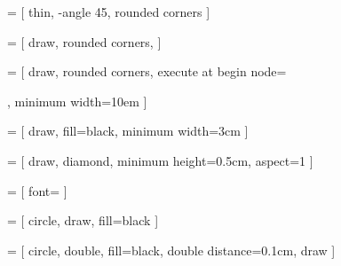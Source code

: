 

 = [%
    thin,
    -angle 45,
    rounded corners
]

 = [%
    draw,
    rounded corners,
]

 = [%
    draw,
    rounded corners,
    execute at begin node={\begin{varwidth}{10em}}, %
    execute at end node={\end{varwidth}},
    minimum width=10em                              %
]

 = [%
    draw,
    fill=black,
    minimum width=3cm
]

 = [%
    draw,
    diamond,
    minimum height=0.5cm,
    aspect=1
]

 = [%
    font=\footnotesize
]

 = [%
    circle,
    draw,
    fill=black
]

 = [%
    circle,
    double,
    fill=black,
    double distance=0.1cm,
    draw
]
